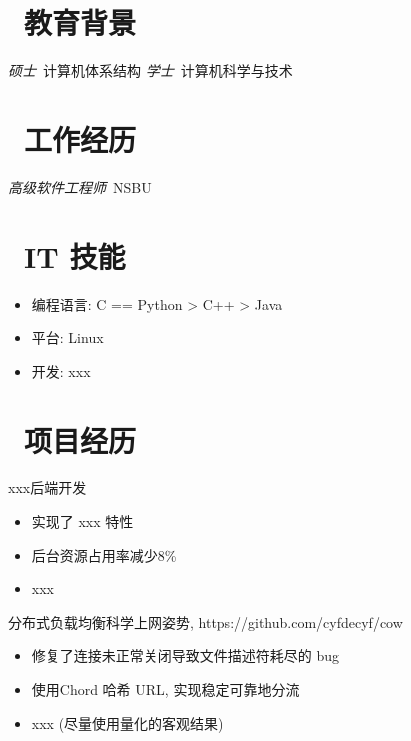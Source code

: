 \documentclass{resume}
\begin{document}


 
\section{\faGraduationCap\  教育背景}
\textit{硕士}\ 计算机体系结构
\textit{学士}\ 计算机科学与技术

\section{\faWrench\  工作经历}
\textit{高级软件工程师}\  NSBU

\section{\faCogs\ IT 技能}
\begin{itemize}[parsep=0.5ex]
  \item 编程语言: C == Python > C++ > Java
  \item 平台: Linux
  \item 开发: xxx
\end{itemize}

\section{\faUsers\ 项目经历}
xxx后端开发
\begin{itemize}
  \item 实现了 xxx 特性
  \item 后台资源占用率减少8\%
  \item xxx
\end{itemize}

\begin{onehalfspacing}
分布式负载均衡科学上网姿势, https://github.com/cyfdecyf/cow
\begin{itemize}
  \item 修复了连接未正常关闭导致文件描述符耗尽的 bug
  \item 使用Chord 哈希 URL, 实现稳定可靠地分流
  \item xxx (尽量使用量化的客观结果)
\end{itemize}
\end{onehalfspacing}
\end{document}
